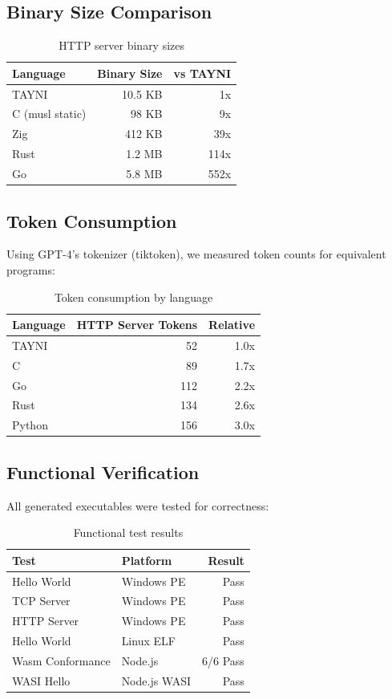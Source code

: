 \documentclass[11pt,a4paper]{article}
\begin{document}
\subsection{Binary Size Comparison}

\begin{table}[h]
\centering
\caption{HTTP server binary sizes}
\begin{tabular}{lrr}
\toprule
Language & Binary Size & vs TAYNI \\
\midrule
TAYNI & 10.5 KB & 1x \\
C (musl static) & 98 KB & 9x \\
Zig & 412 KB & 39x \\
Rust & 1.2 MB & 114x \\
Go & 5.8 MB & 552x \\
\bottomrule
\end{tabular}
\end{table}

\subsection{Token Consumption}

Using GPT-4's tokenizer (tiktoken), we measured token counts for equivalent programs:

\begin{table}[h]
\centering
\caption{Token consumption by language}
\begin{tabular}{lrr}
\toprule
Language & HTTP Server Tokens & Relative \\
\midrule
TAYNI & 52 & 1.0x \\
C & 89 & 1.7x \\
Go & 112 & 2.2x \\
Rust & 134 & 2.6x \\
Python & 156 & 3.0x \\
\bottomrule
\end{tabular}
\end{table}

\subsection{Functional Verification}

All generated executables were tested for correctness:

\begin{table}[h]
\centering
\caption{Functional test results}
\begin{tabular}{llr}
\toprule
Test & Platform & Result \\
\midrule
Hello World & Windows PE & Pass \\
TCP Server & Windows PE & Pass \\
HTTP Server & Windows PE & Pass \\
Hello World & Linux ELF & Pass \\
Wasm Conformance & Node.js & 6/6 Pass \\
WASI Hello & Node.js WASI & Pass \\
\bottomrule
\end{tabular}
\end{table}
\end{document}
